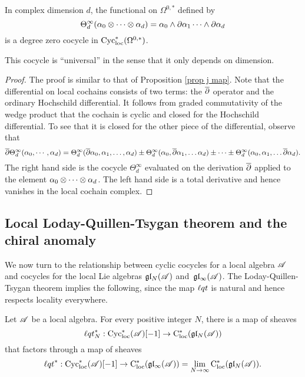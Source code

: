 \begin{lem}
\label{lem: univ}
In complex dimension $d$, 
the functional on $\Omega^{0,*}$ defined by
\[
\Theta^\infty_d (\alpha_0 \otimes \cdots \otimes \alpha_d) = \alpha_0 \wedge \partial \alpha_1 \cdots \wedge \partial \alpha_d
\]
is a degree zero cocycle in ${\rm Cyc}_{\rm loc}^*(\Omega^{0,*})$. 
\end{lem}

This cocycle is ``universal'' in the sense that it only depends on dimension.

\begin{proof}
The proof is similar to that of Proposition \ref{prop j map}. 
Note that the differential on local cochains consists of two terms: the $\overline{\partial}$ operator and the ordinary Hochschild differential. 
It follows from graded commutativity of the wedge product that the cochain is cyclic and closed for the Hochschild differential. 
To see that it is closed for the other piece of the differential, observe that
\[
\overline{\partial} \Theta^\infty_d(\alpha_0,\cdots,\alpha_d) = \Theta^\infty_d(\overline{\partial} \alpha_0, \alpha_1,\ldots,\alpha_d) \pm \Theta_d^\infty(\alpha_0, \overline{\partial} \alpha_1,\ldots \alpha_d) \pm \cdots \pm \Theta_d^\infty(\alpha_0, \alpha_1,\ldots \overline{\partial} \alpha_d) .
\]
The right hand side is the cocycle $\Theta_d^\infty$ evaluated on the derivation $\overline{\partial}$ applied to the element $\alpha_0 \otimes \cdots \otimes \alpha_d$. 
The left hand side is a total derivative and hence vanishes in the local cochain complex. 
\end{proof}

\subsection{Local Loday-Quillen-Tsygan theorem and the chiral anomaly}

We now turn to the relationship between cyclic cocycles for a local algebra $\mathscr A$ and cocycles for the local Lie algebras $\mathfrak{g} \mathfrak{l}_N( \mathscr A)$ and~$\mathfrak{g} \mathfrak{l}_\infty (\mathscr A)$.
The Loday-Quillen-Tsygan theorem implies the following,
since the map ${\ell q t}$ is natural and hence respects locality everywhere.

\begin{prop}
\label{prop: cycloc}
Let $\mathscr A$ be a local algebra.
For every positive integer $N$, there is a map of sheaves
\[
{\ell q t}_N^* : {\rm Cyc}_{\rm loc}^*(\mathscr A)[-1] \to {\rm C}_{\rm loc}^*(\mathfrak{g} \mathfrak{l}_N( \mathscr A)) 
\] 
that factors through a map of sheaves
\[
{\ell q t}^* : {\rm Cyc}_{\rm loc}^*(\mathscr A)[-1] \to {\rm C}_{\rm loc}^*(\mathfrak{g} \mathfrak{l}_\infty( \mathscr A)) = \lim_{N \to \infty} {\rm C}_{\rm loc}^*(\mathfrak{g} \mathfrak{l}_N( \mathscr A))  .
\]
\end{prop}

